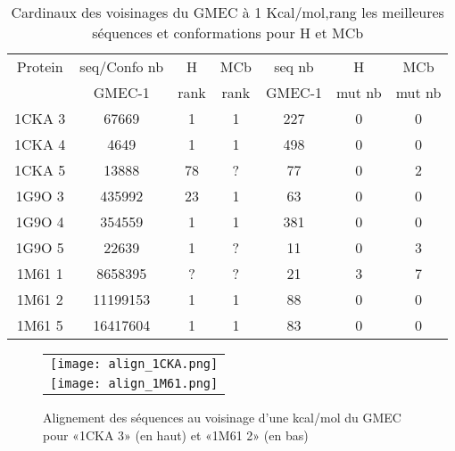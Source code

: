     \begin{table}[h]
      \centering

      \begin{tabular}{ccccccc}


        \toprule
        Protein & seq/Confo nb  & H      & MCb   & seq nb  & H  & MCb  \\
                &     GMEC-1    &  rank &  rank & GMEC-1  & mut nb & mut nb \\
        \cmidrule{1-7}
        1CKA 3 & 67669    & 1  & 1 & 227  & 0 & 0 \\
        1CKA 4 & 4649     & 1  & 1 & 498  & 0 & 0 \\
        1CKA 5 & 13888    & 78 & ? & 77   & 0 & 2 \\
        1G9O 3 & 435992   & 23 & 1 & 63   & 0 & 0 \\
        1G9O 4 & 354559   & 1  & 1 & 381  & 0 & 0 \\
        1G9O 5 & 22639    & 1  & ? &  11  & 0 & 3 \\
        1M61 1 & 8658395  & ?  & ? & 21   & 3 & 7 \\
        1M61 2 & 11199153 & 1  & 1 & 88   & 0 & 0 \\
        1M61 5 & 16417604 & 1  & 1 & 83   & 0 & 0 \\
        \bottomrule
      \end{tabular} 
 \caption{Cardinaux  des voisinages du GMEC à 1 Kcal/mol,rang les meilleures séquences et conformations pour H et MCb}
\label{tab:etude_au_voisinnage}           
\end{table}


   \begin{figure}
     \centering
\begin{tabular}{c}
          \texttt{[image: align\_1CKA.png]}\\
          \texttt{[image: align\_1M61.png]} \\
\end{tabular}
     \caption{Alignement des séquences au voisinage d'une kcal/mol du GMEC pour «1CKA 3» (en haut) et «1M61 2» (en bas)}
\label{image:Align_Suboptimal}
\end{figure}



